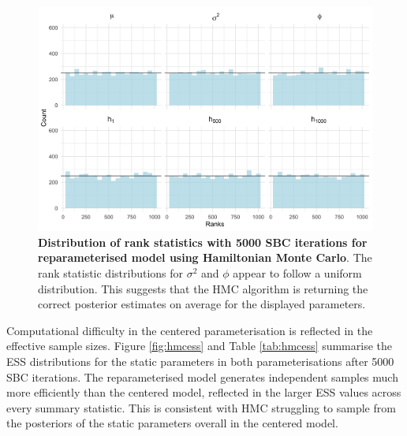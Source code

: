 \documentclass[12pt, a4paper]{article}
\begin{document}
    \begin{figure}[H]
        \centering
        \includegraphics[scale=0.09]{results/hmc_ncp_5k.png}
        \caption{\textbf{Distribution of rank statistics with 5000 SBC iterations for reparameterised model using Hamiltonian Monte Carlo}. The rank statistic distributions for $\sigma^2$ and $\phi$ appear to follow a uniform distribution. This suggests that the HMC algorithm is returning the correct posterior estimates on average for the displayed parameters.}
        \label{fig:ncphmc5k}
    \end{figure}

    Computational difficulty in the centered parameterisation is reflected in the effective sample sizes. Figure \ref{fig:hmcess} and Table \ref{tab:hmcess} summarise the ESS distributions for the static parameters in both parameterisations after 5000 SBC iterations. The reparameterised model generates independent samples much more efficiently than the centered model, reflected in the larger ESS values across every summary statistic. This is consistent with HMC struggling to sample from the posteriors of the static parameters overall in the centered model. 
\end{document}

